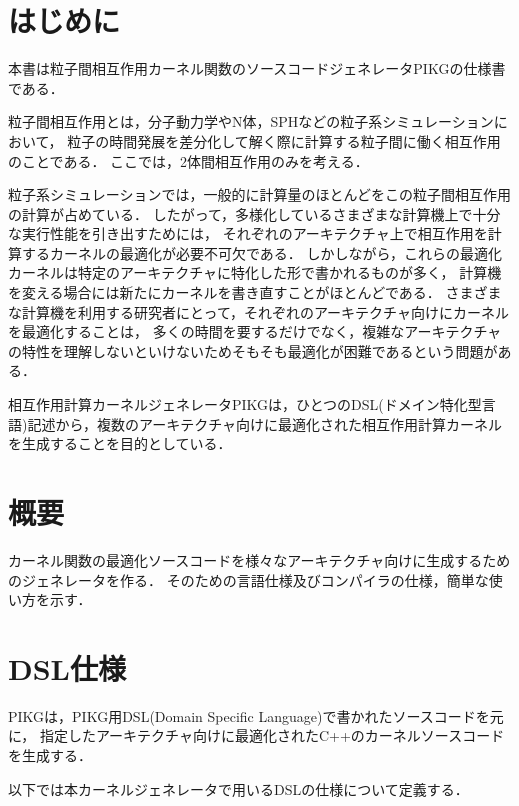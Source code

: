 \documentclass{article}
\begin{document}
\section{はじめに}
本書は粒子間相互作用カーネル関数のソースコードジェネレータPIKGの仕様書である．

粒子間相互作用とは，分子動力学やN体，SPHなどの粒子系シミュレーションにおいて，
粒子の時間発展を差分化して解く際に計算する粒子間に働く相互作用のことである．
ここでは，2体間相互作用のみを考える．

粒子系シミュレーションでは，一般的に計算量のほとんどをこの粒子間相互作用の計算が占めている．
したがって，多様化しているさまざまな計算機上で十分な実行性能を引き出すためには，
それぞれのアーキテクチャ上で相互作用を計算するカーネルの最適化が必要不可欠である．
しかしながら，これらの最適化カーネルは特定のアーキテクチャに特化した形で書かれるものが多く，
計算機を変える場合には新たにカーネルを書き直すことがほとんどである．
さまざまな計算機を利用する研究者にとって，それぞれのアーキテクチャ向けにカーネルを最適化することは，
多くの時間を要するだけでなく，複雑なアーキテクチャの特性を理解しないといけないためそもそも最適化が困難であるという問題がある．

相互作用計算カーネルジェネレータPIKGは，ひとつのDSL(ドメイン特化型言語)記述から，複数のアーキテクチャ向けに最適化された相互作用計算カーネルを生成することを目的としている．

\section{概要}
カーネル関数の最適化ソースコードを様々なアーキテクチャ向けに生成するためのジェネレータを作る．
そのための言語仕様及びコンパイラの仕様，簡単な使い方を示す．

\section{DSL仕様}
PIKGは，PIKG用DSL(Domain Specific Language)で書かれたソースコードを元に，
指定したアーキテクチャ向けに最適化されたC++のカーネルソースコードを生成する．

以下では本カーネルジェネレータで用いるDSLの仕様について定義する．
\end{document}
